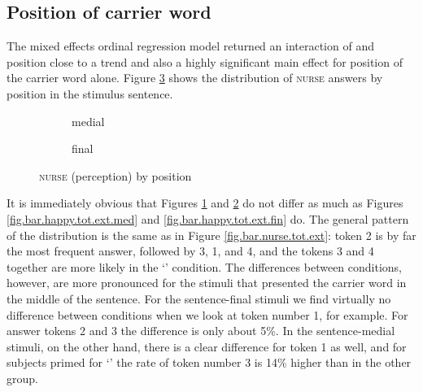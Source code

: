 \subsection{Position of carrier word}
\label{sec.perc_res.nurse.position}

The mixed effects ordinal regression model returned an interaction of  and position close to a trend and also a highly significant main effect for position of the carrier word alone.
Figure \ref{fig.bar.nurse.tot.ext.pos} shows the distribution of \textsc{nurse} answers by position in the stimulus sentence.

\begin{figure}[h]
	\centering
	\begin{subfigure}{0.49\textwidth}
		\centering
			\resizebox{\linewidth}{!}{} 
		\caption{medial}
		\label{fig.bar.nurse.tot.ext.med}
	\end{subfigure}
	\begin{subfigure}{0.49\textwidth}
		\centering
			\resizebox{\linewidth}{!}{} 
		\caption{final}
		\label{fig.bar.nurse.tot.ext.fin}
	\end{subfigure}
	\caption{\textsc{nurse} (perception) by position}
	\label{fig.bar.nurse.tot.ext.pos}
\end{figure}

It is immediately obvious that Figures \ref{fig.bar.nurse.tot.ext.med} and \ref{fig.bar.nurse.tot.ext.fin} do not differ as much as Figures \ref{fig.bar.happy.tot.ext.med} and \ref{fig.bar.happy.tot.ext.fin} do.
The general pattern of the distribution is the same as in Figure \ref{fig.bar.nurse.tot.ext}: token 2 is by far the most frequent answer, followed by 3, 1, and 4, and the  tokens 3 and 4 together are more likely in the `' condition.
The differences between  conditions, however, are more pronounced for the stimuli that presented the carrier word in the middle of the sentence.
For the sentence-final stimuli we find virtually no difference between  conditions when we look at token number 1, for example.
For answer tokens 2 and 3 the difference is only about 5\%.
In the sentence-medial stimuli, on the other hand, there is a clear difference for token 1 as well, and for subjects primed for `' the rate of token number 3 is 14\% higher than in the other group.

